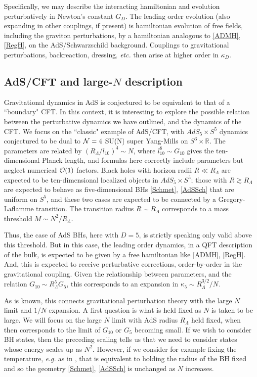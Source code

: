 \documentclass[11pt]{article}
\numberwithin{equation}{section}
\newcommand{\calo}{{\cal O}}
\begin{document}
Specifically, we may describe the interacting hamiltonian and evolution perturbatively in Newton's constant $G_D$.  The leading order evolution (also expanding in other couplings, if present) is hamiltonian evolution of free fields, including the graviton perturbations, by a hamiltonian analogous to \eqref{ADMH},  \eqref{RegH}, on the AdS/Schwarzschild background.  Couplings to gravitational perturbations, backreaction, dressing, {\it etc.} then arise at higher order in $\kappa_D$.

\subsection{AdS/CFT and large-$N$ description}

Gravitational dynamics in AdS is conjectured to be equivalent to that of a ``boundary"  CFT\cite{Mald}.  In this context, it is interesting to explore the possible relation between the perturbative dynamics we have outlined, and the dynamics of the CFT.  We focus on the ``classic" example of AdS/CFT, with $AdS_5\times S^5$ dynamics conjectured to be dual to ${\cal N}=4$ SU(N) super Yang-Mills on $S^3\times \mathbb{R}$.  The parameters are related by $(R_\Lambda/l_{10})^4 \sim  N$, where  $l_{10}^8 \sim G_{10}$ gives the ten-dimensional Planck length, and formulas here correctly include parameters but neglect numerical $\calo(1)$ factors.  Black holes with horizon radii $R\ll R_\Lambda$ are expected to be ten-dimensional localized objects in $AdS_5\times S^5$; those with $R\gtrsim R_\Lambda$ are expected to behave as five-dimensional BHs \eqref{Schmet}, \eqref{AdSSch} that are uniform on $S^5$, and these two cases are expected to be connected by a Gregory-Laflamme transition\cite{GrLa}.  The transition radius $R\sim R_\Lambda$ corresponds to a mass threshold $M\sim N^2/R_\Lambda$.  

Thus, the case of AdS BHs, here with $D=5$, is strictly speaking only valid above this threshold.  But in this case, the leading order dynamics, in a QFT description of the bulk, is expected to be given by a free hamiltonian like \eqref{ADMH},  \eqref{RegH}.  And, this is expected to receive perturbative corrections, order-by-order in the gravitational coupling.  Given the relationship between parameters, and the relation $G_{10}\sim R_\Lambda^5 G_5$, this corresponds to an expansion in $\kappa_5\sim R^{3/2}_\Lambda/N$.  

As is known, this connects gravitational perturbation theory with the large $N$ limit and $1/N$ expansion.  A first question is what is held fixed as $N$ is taken to be large.  We will focus on the large $N$ limit with AdS radius $R_\Lambda$ held fixed, when then corresponds to the limit of $G_{10}$ or $G_5$ becoming small.  If we wish to consider BH states, then the preceding scaling tells us that we need to consider states whose energy scales up as $N^2$.  However, if we consider for example fixing the temperature, {\it e.g.} as in \cite{ScWi}, that is equivalent to holding the radius of the BH fixed and so the geometry  \eqref{Schmet}, \eqref{AdSSch} is unchanged as $N$ increases.
\end{document}
